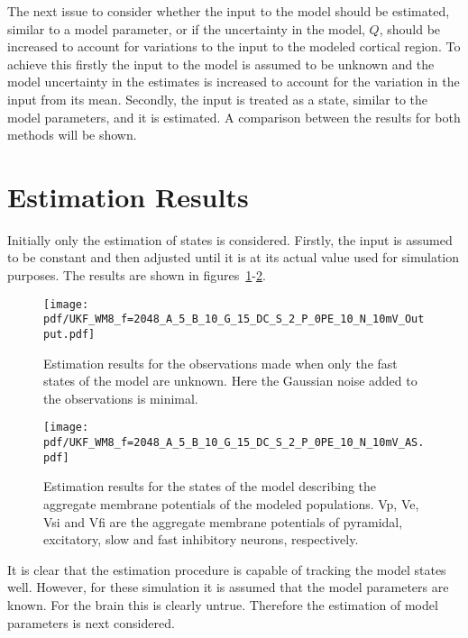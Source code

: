 
The next issue to consider whether the input to the model should be estimated, similar to a model parameter, or if the uncertainty in the model, $Q$, should be increased to account for variations to the input to the modeled cortical region. To achieve this firstly the input to the model is assumed to be unknown and the model uncertainty in the estimates is increased to account for the variation in the input from its mean. Secondly, the input is treated as a state, similar to the model parameters, and it is estimated. A comparison between the results for both methods will be shown.

\section{Estimation Results}

Initially only the estimation of states is considered. Firstly, the input is assumed to be constant and then adjusted until it is at its actual value used for simulation purposes. The results are shown in figures~\ref{fig: OutputSO}-\ref{fig: AllStates}.

\begin{figure}
	\centering
		\texttt{[image: pdf/UKF\_WM8\_f=2048\_A\_5\_B\_10\_G\_15\_DC\_S\_2\_P\_0PE\_10\_N\_10mV\_Output.pdf]}
			\caption{Estimation results for the observations made when only the fast states of the model are unknown. Here the Gaussian noise added to the observations is minimal.}
	\label{fig: OutputSO}
\end{figure}

\begin{figure}
	\centering
		\texttt{[image: pdf/UKF\_WM8\_f=2048\_A\_5\_B\_10\_G\_15\_DC\_S\_2\_P\_0PE\_10\_N\_10mV\_AS.pdf]}
		\caption{Estimation results for the states of the model describing the aggregate membrane potentials of the modeled populations. Vp, Ve, Vsi and Vfi are the aggregate membrane potentials of pyramidal, excitatory, slow and fast inhibitory neurons, respectively.}
	\label{fig: AllStates}
\end{figure}


It is clear that the estimation procedure is capable of tracking the model states well. However, for these simulation it is assumed that the model parameters are known. For the brain this is clearly untrue. Therefore the estimation of model parameters is next considered. 

